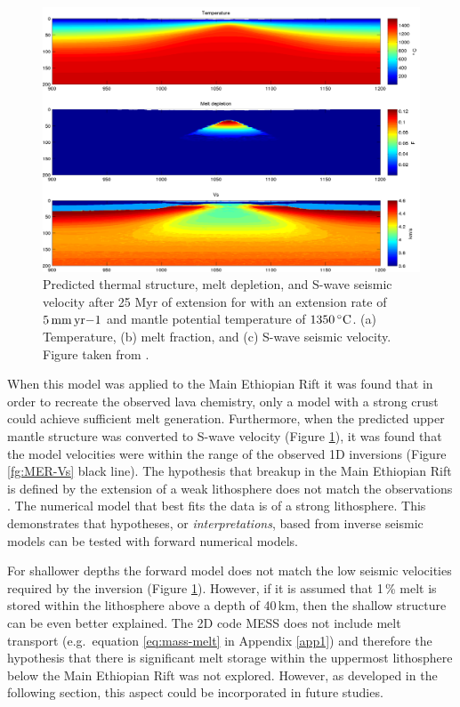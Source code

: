 \begin{figure}
\centering
\includegraphics[width=\textwidth]{./figures/ch2-mantleVs.pdf}
\caption{Predicted thermal structure, melt depletion, and S-wave seismic velocity after 25 Myr of extension for with an extension rate of $5\rm\,mm\,yr{-1}$ and mantle potential temperature of $1350\rm\,^{\circ}C$. (a) Temperature, (b) melt fraction, and (c) S-wave seismic velocity. Figure taken from \cite{armitage-etal-g3-2018}.}
\label{fg:mantleVs}
\end{figure} 

When this model was applied to the Main Ethiopian Rift it was found that in order to recreate the observed lava chemistry, only a model with a strong crust could achieve sufficient melt generation. Furthermore, when the predicted upper mantle structure was converted to S-wave velocity (Figure \ref{fg:mantleVs}), it was found that the model velocities were within the range of the observed 1D inversions (Figure \ref{fg:MER-Vs} black line). The hypothesis that breakup in the Main Ethiopian Rift is defined by the extension of a weak lithosphere does not match the observations \citep[c.f.][]{keranen-etal-2009}. The numerical model that best fits the data is of a strong lithosphere. This demonstrates that hypotheses, or \emph{interpretations}, based from inverse seismic models can be tested with forward numerical models.

For shallower depths the forward model does not match the low seismic velocities required by the inversion (Figure \ref{fg:mantleVs}). However, if it is assumed that 1\,\% melt is stored within the lithosphere above a depth of 40\,km, then the shallow structure can be even better explained. The 2D code MESS does not include melt transport (e.g.\ equation \ref{eq:mass-melt} in Appendix \ref{app1}) and therefore the hypothesis that there is significant melt storage within the uppermost lithosphere below the Main Ethiopian Rift was not explored. However, as developed in the following section, this aspect could be incorporated in future studies.


